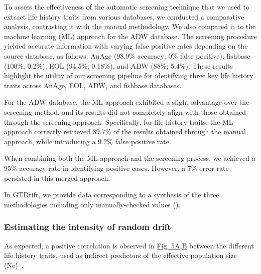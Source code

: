 To assess the effectiveness of the automatic screening technique that we used to extract life history traits from various databases, we conducted a comparative analysis, contrasting it with the manual methodology. We also compared it to the machine learning (ML) approach for the \acrshort{ADW} database. The screening procedure yielded accurate information with varying false positive rates depending on the source database, as follows: AnAge (98.9\% accuracy; 0\% false positive), fishbase (100\%; 0.2\%), EOL (94.5\%; 0.18\%), and \acrshort{ADW} (88\%; 5.4\%). These results highlight the utility of our screening pipeline for identifying three key life history traits across AnAge, \acrshort{EOL}, \acrshort{ADW}, and fishbase databases.

For the \acrshort{ADW} database, the \acrshort{ML} approach exhibited a slight advantage over the screening method, and its results did not completely align with those obtained through the screening approach. Specifically, for life history traits, the \acrshort{ML} approach correctly retrieved 89.7\% of the results obtained through the manual approach, while introducing a 9.2\% false positive rate.

When combining both the \acrshort{ML} approach and the screening process, we achieved a 95\% accuracy rate in identifying positive cases. However, a 7\% error rate persisted in this merged approach.

In GTDrift, we provide data corresponding to a synthesis of the three methodologies including only manually-checked values ().


\subsubsection{Estimating the intensity of random drift}
As expected, a positive correlation is observed in \hyperref[fig:gtdrift5]{Fig. 5A,B} between the different life history traits, used as indirect predictors of the effective population size (\acrshort{Ne})~\citep{romiguier_comparative_2014, waples_life-history_2016, figuet_life_2016, galtier_adaptive_2016, weyna_relaxation_2020}.


